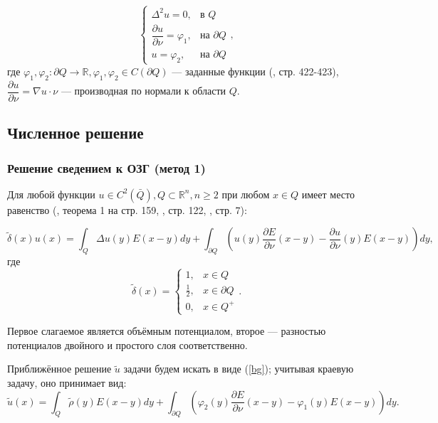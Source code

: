 \documentclass[a4paper, 12pt]{article}
\newcommand{\R}[1]{\mathbb{R}^#1}
\newcommand{\der}[2]{\dfrac{\partial #1}{\partial #2}}
\begin{document}
\[
  \begin{cases}
\Delta^2 u=0, & \text{в $Q$} \\
\der{u}{\nu}=\varphi_1, & \text{на $\partial Q$}\\
u=\varphi_2, & \text{на $\partial Q$}
\end{cases},
\]
где $\varphi_1, \varphi_2: \partial Q \rightarrow \mathbb{R},\varphi_1, \varphi_2 \in C(\partial Q) $ --- заданные функции (\cite{samar}, стр. 422-423),
$\der{u}{\nu}=\nabla u \cdot \nu$ --- производная по нормали к области $Q$.

\subsection{Численное решение}
\subsubsection{Решение сведением к ОЗГ (метод 1)}
Для любой функции $u \in C^2(\bar Q), Q \subset \R{n}, n \geq 2$
при любом $x \in Q$ имеет место равенство (\cite{mich}, теорема 1 на стр. 159, \cite{lezh}, стр. 122, \cite{lezh2}, стр. 7):

\begin{equation}
   \tilde{\delta}(x) u(x)= \int_Q \Delta u(y) E(x-y) dy + \int_{\partial Q} \left(u(y)\der{E}{\nu}(x-y)-\der{u}{\nu}(y) E(x-y) \right) dy,
    \label{bg}
\end{equation}
где 
\[
    \tilde{\delta}(x) =
\begin{cases}
1, & x \in Q \\
\frac{1}{2}, & x \in \partial Q\\ 
0,& x \in Q^+ 
\end{cases}.
\]
  
Первое слагаемое является объёмным потенциалом, второе --- разностью потенциалов двойного и простого слоя соответственно.

Приближённое решение $\tilde{u}$ задачи будем искать в виде (\ref{bg}); учитывая краевую задачу, оно принимает вид:
\begin{equation}
  \tilde{u}(x)= \int_Q \tilde{\rho}(y) E(x-y) dy + \int_{\partial Q} \left(\varphi_2(y)\der{E}{\nu}(x-y)-\varphi_1(y) E(x-y) \right) dy.
  \label{u1}
\end{equation}
\end{document}
